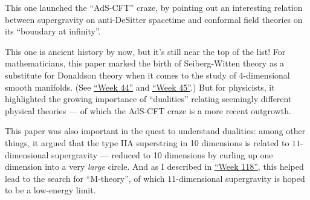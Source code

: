 \documentclass{article}
\def\tightlist{}
\renewcommand{\texttt}[1]{%
  \begingroup
  \ttfamily
  \begingroup\lccode`~=`/\lowercase{\endgroup\def~}{/\discretionary{}{}{}}%
  \begingroup\lccode`~=`[\lowercase{\endgroup\def~}{[\discretionary{}{}{}}%
  \begingroup\lccode`~=`.\lowercase{\endgroup\def~}{.\discretionary{}{}{}}%
  \catcode`/=\active\catcode`[=\active\catcode`.=\active
  \scantokens{#1\noexpand}%
  \endgroup
}
\begin{document}

This one launched the ``AdS-CFT'' craze, by pointing out an interesting
relation between supergravity on anti-DeSitter spacetime and conformal
field theories on its ``boundary at infinity''.


This one is ancient history by now, but it's still near the top of the
list! For mathematicians, this paper marked the birth of Seiberg-Witten
theory as a substitute for Donaldson theory when it comes to the study
of \(4\)-dimensional smooth manifolds. (See
\protect\hyperlink{week44}{``Week 44''} and
\protect\hyperlink{week45}{``Week 45''}.) But for physicists, it
highlighted the growing importance of ``dualities'' relating seemingly
different physical theories --- of which the AdS-CFT craze is a more
recent outgrowth.


This paper was also important in the quest to understand dualities:
among other things, it argued that the type IIA superstring in 10
dimensions is related to \(11\)-dimensional supergravity --- reduced to
10 dimensions by curling up one dimension into a very \emph{large}
circle. And as I described in \protect\hyperlink{week118}{``Week 118''},
this helped lead to the search for ``M-theory'', of which
\(11\)-dimensional supergravity is hoped to be a low-energy limit.
\end{document}
